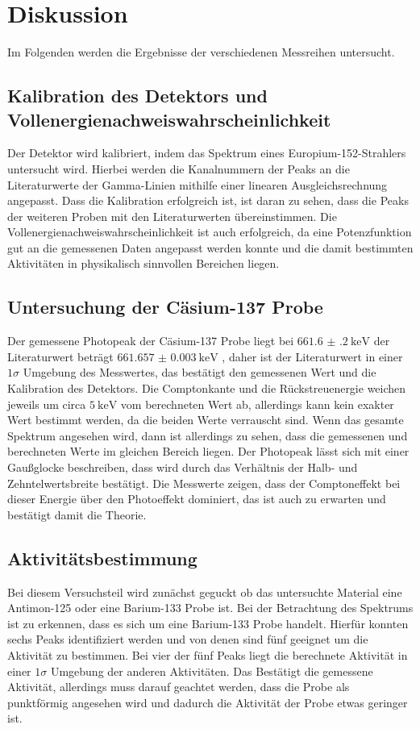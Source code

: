 \section{Diskussion}
\label{sec:Diskussion}
Im Folgenden werden die Ergebnisse der verschiedenen Messreihen untersucht.
\subsection{Kalibration des Detektors und Vollenergienachweiswahrscheinlichkeit}
Der Detektor wird kalibriert, indem das Spektrum eines Europium-152-Strahlers untersucht wird.
Hierbei werden die Kanalnummern der Peaks an die Literaturwerte \cite{Gamma_lit} der Gamma-Linien mithilfe einer linearen 
Ausgleichsrechnung angepasst. Dass die Kalibration erfolgreich ist, ist daran zu sehen, dass die Peaks der weiteren
Proben mit den Literaturwerten übereinstimmen.
Die Vollenergienachweiswahrscheinlichkeit ist auch erfolgreich, da eine Potenzfunktion gut an die gemessenen Daten angepasst werden konnte und die 
damit bestimmten Aktivitäten in physikalisch sinnvollen Bereichen liegen. 
\subsection{Untersuchung der Cäsium-137 Probe}
Der gemessene Photopeak der Cäsium-137 Probe liegt bei $\SI{661.6(2)}{\kilo\eV}$ der Literaturwert beträgt $\SI{661.657(3)}{\kilo\eV}$ \cite{Gamma_lit},
daher ist der Literaturwert in einer $1\sigma$ Umgebung des Messwertes, das bestätigt den gemessenen Wert und die Kalibration des 
Detektors. Die Comptonkante und die Rückstreuenergie weichen jeweils um circa $\SI{5}{\kilo\eV}$ vom berechneten Wert ab, allerdings
kann kein exakter Wert bestimmt werden, da die beiden Werte verrauscht sind. Wenn das gesamte Spektrum angesehen wird, dann ist allerdings 
zu sehen, dass die gemessenen und berechneten Werte im gleichen Bereich liegen.
Der Photopeak lässt sich mit einer Gaußglocke beschreiben, dass wird durch das Verhältnis der Halb- und Zehntelwertsbreite 
bestätigt. 
Die Messwerte zeigen, dass der Comptoneffekt bei dieser Energie über den Photoeffekt dominiert, das ist auch zu erwarten und bestätigt 
damit die Theorie.
\subsection{Aktivitätsbestimmung}
Bei diesem Versuchsteil wird zunächst geguckt ob das untersuchte Material eine Antimon-125 oder eine Barium-133 Probe ist.
Bei der Betrachtung des Spektrums ist zu erkennen, dass es sich um eine Barium-133 Probe handelt.
Hierfür konnten sechs Peaks identifiziert werden und von denen sind fünf geeignet um die Aktivität zu bestimmen.
Bei vier der fünf Peaks liegt die berechnete Aktivität in einer $1\sigma$ Umgebung der anderen Aktivitäten. 
Das Bestätigt die gemessene Aktivität, allerdings muss darauf geachtet werden, dass die Probe als punktförmig angesehen wird
und dadurch die Aktivität der Probe etwas geringer ist.
